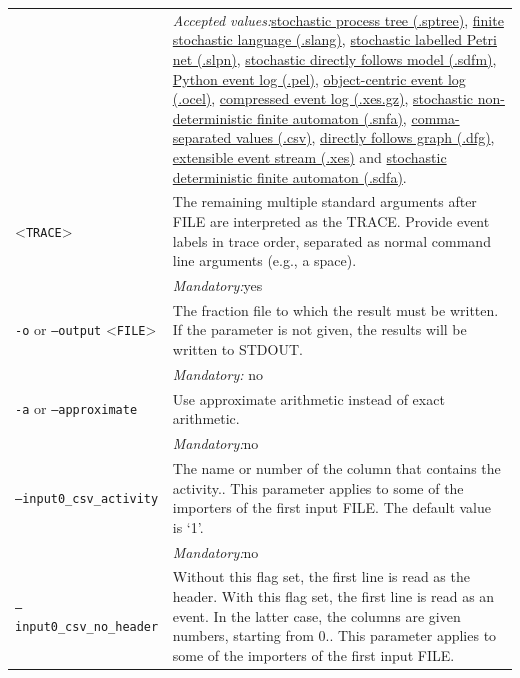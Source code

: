 {\begin{tabularx}{\linewidth}{lX}
&\textit{Accepted values:}\quad \hyperref[filehandler:stochastic process tree]{stochastic process tree (.sptree)}, \hyperref[filehandler:finite stochastic language]{finite stochastic language (.slang)}, \hyperref[filehandler:stochastic labelled Petri net]{stochastic labelled Petri net (.slpn)}, \hyperref[filehandler:stochastic directly follows model]{stochastic directly follows model (.sdfm)}, \hyperref[filehandler:Python event log]{Python event log (.pel)}, \hyperref[filehandler:object-centric event log]{object-centric event log (.ocel)}, \hyperref[filehandler:compressed event log]{compressed event log (.xes.gz)}, \hyperref[filehandler:stochastic non-deterministic finite automaton]{stochastic non-deterministic finite automaton (.snfa)}, \hyperref[filehandler:comma-separated values]{comma-separated values (.csv)}, \hyperref[filehandler:directly follows graph]{directly follows graph (.dfg)}, \hyperref[filehandler:extensible event stream]{extensible event stream (.xes)} and \hyperref[filehandler:stochastic deterministic finite automaton]{stochastic deterministic finite automaton (.sdfa)}.\\
<\texttt{TRACE}>
&The remaining multiple standard arguments after FILE are  interpreted as the TRACE. Provide event labels in trace order, separated as normal command line arguments (e.g., a space).\\
&\textit{Mandatory:}\quad yes\\
\texttt{-o} or \texttt{--output} <\texttt{FILE}> &
The fraction file to which the result must be written. If the parameter is not given, the results will be written to STDOUT.\\
&\textit{Mandatory:} \quad no\\
\texttt{-a} or \texttt{--approximate} & Use approximate arithmetic instead of exact arithmetic.\\
&\textit{Mandatory:}\quad no\\
\texttt{--input0\_csv\_activity} & The name or number of the column that contains the activity.. This parameter applies to some of the importers of the first input FILE. The default value is `1'.\\
&\textit{Mandatory:}\quad no\\
\texttt{--input0\_csv\_no\_header} & Without this flag set, the first line is read as the header. 
    With this flag set, the first line is read as an event. In the latter case, the columns are given numbers, starting from 0.. This parameter applies to some of the importers of the first input FILE. \\

\end{tabularx}}
